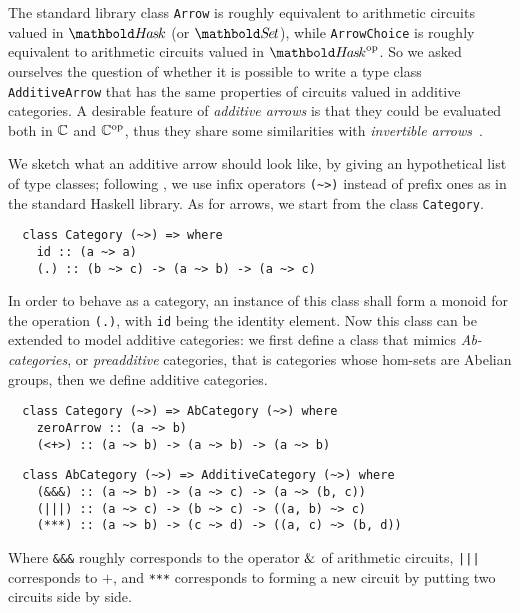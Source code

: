 The standard library class \lstinline+Arrow+ is roughly equivalent to
arithmetic circuits valued in $\Hask$ (or $\Set$),
while \lstinline+ArrowChoice+ is roughly equivalent to arithmetic
circuits valued in $\Hask^\op$. So we asked ourselves the
question of whether it is possible to write a type class
\lstinline+AdditiveArrow+ that has the same properties of circuits
valued in additive categories. A desirable feature of \emph{additive
  arrows} is that they could be evaluated both in $\mathbb{C}$ and $\mathbb{C}^{\mathrm{op}}$,
thus they share some similarities with \emph{invertible
  arrows}~\cite{alimarine+al:invertible-arrows}.

We sketch what an additive arrow should look like, by giving an
hypothetical list of type classes; following
\cite{yorgey:typeclassopedia}, we use infix operators \lstinline+(~>)+
instead of prefix ones as in the standard Haskell library.  As for
arrows, we start from the class \lstinline+Category+.

\begin{lstlisting}
  class Category (~>) => where
    id :: (a ~> a)
    (.) :: (b ~> c) -> (a ~> b) -> (a ~> c)
\end{lstlisting}

In order to behave as a category, an instance of this class shall form
a monoid for the operation \lstinline+(.)+, with \lstinline+id+ being
the identity element. Now this class can be extended to model additive
categories: we first define a class that mimics \emph{Ab-categories},
or \emph{preadditive} categories, that is categories whose hom-sets
are Abelian groups, then we define additive categories.

\begin{lstlisting}
  class Category (~>) => AbCategory (~>) where
    zeroArrow :: (a ~> b)
    (<+>) :: (a ~> b) -> (a ~> b) -> (a ~> b)
\end{lstlisting}

\begin{lstlisting}
  class AbCategory (~>) => AdditiveCategory (~>) where
    (&&&) :: (a ~> b) -> (a ~> c) -> (a ~> (b, c))
    (|||) :: (a ~> c) -> (b ~> c) -> ((a, b) ~> c)
    (***) :: (a ~> b) -> (c ~> d) -> ((a, c) ~> (b, d))
\end{lstlisting}

Where \lstinline+&&&+ roughly corresponds to the operator $\operatorname{\&}$ of
arithmetic circuits, \lstinline+|||+ corresponds to $+$, and
\lstinline+***+ corresponds to forming a new circuit by putting two
circuits side by side.

